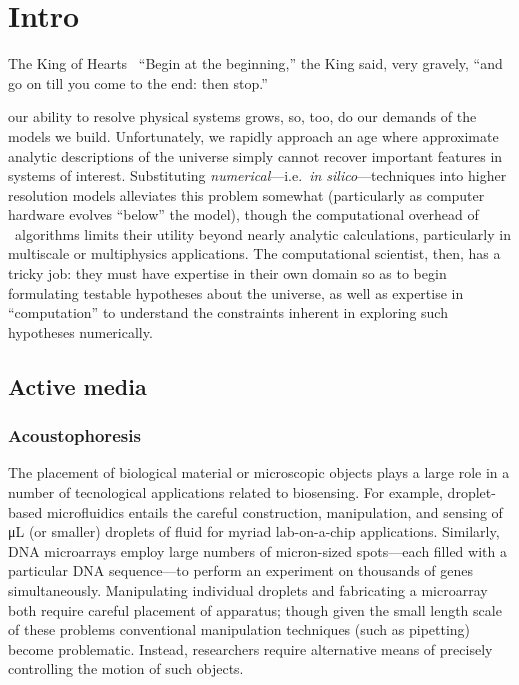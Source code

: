 \chapter{\label{ch:intro}Intro}

\begin{frontquote}{The King of Hearts~\cite{wonderland}}
``Begin at the beginning,'' the King said, very gravely, ``and go on till you come to the end: then stop.''
\end{frontquote}

 our ability to resolve physical systems grows, so, too, do our demands of the models we build.
Unfortunately, we rapidly approach an age where approximate analytic descriptions of the universe simply cannot recover important features in systems of interest.
Substituting \emph{numerical}---i.e.\ \emph{in silico}---techniques into higher resolution models alleviates this problem somewhat (particularly as computer hardware evolves ``below'' the model), though the computational overhead of \naive\ algorithms limits their utility beyond nearly analytic calculations, particularly in multiscale or multiphysics applications.
The computational scientist, then, has a tricky job: they must have expertise in their own domain so as to begin formulating testable hypotheses about the universe, as well as expertise in ``computation'' to understand the constraints inherent in exploring such hypotheses numerically.

\section{Active media}

\subsection{Acoustophoresis}

The placement of biological material or microscopic objects plays a large role in a number of tecnological applications related to biosensing.
For example, droplet-based microfluidics entails the careful construction, manipulation, and sensing of \si{\micro\liter} (or smaller) droplets of fluid for myriad lab-on-a-chip applications.
Similarly, DNA microarrays employ large numbers of micron-sized spots---each filled with a particular DNA sequence---to perform an experiment on thousands of genes simultaneously.
Manipulating individual droplets and fabricating a microarray both require careful placement of apparatus; though given the small length scale of these problems conventional manipulation techniques (such as pipetting) become problematic.
Instead, researchers require alternative means of precisely controlling the motion of such objects.

